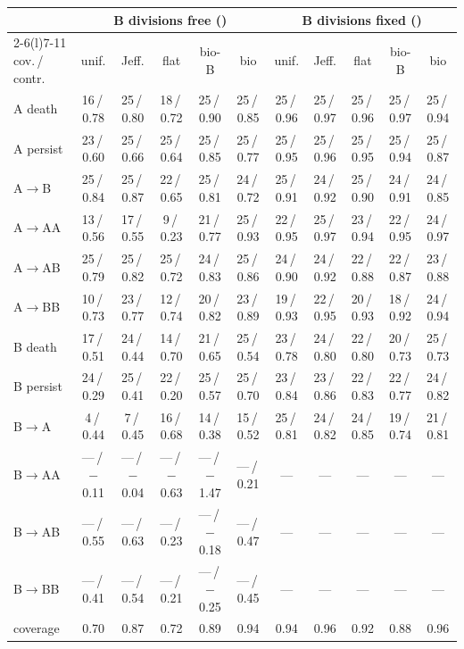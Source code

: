 \documentclass[10pt,a4paper]{article}
\newcommand{\code}[1]{\texttt{\detokenize{#1}}}
\begin{document}
\begin{center}
\medskip
\begin{tabular}{@{}lccccc@{\hspace{8pt}}ccccc@{}}\toprule
 & \multicolumn{5}{c}{B divisions free (\code{two_type})} & \multicolumn{5}{c}{B divisions fixed (\code{reversible_ab})} \\\cmidrule(lr){2-6}\cmidrule(l){7-11}
cov.\,/\,contr. & unif. & Jeff. & flat & bio-B & bio & unif. & Jeff. & flat & bio-B & bio \\\midrule
A death & 16\,/\,0.78 & 25\,/\,0.80 & 18\,/\,0.72 & 25\,/\,0.90 & 25\,/\,0.85 & 25\,/\,0.96 & 25\,/\,0.97 & 25\,/\,0.96 & 25\,/\,0.97 & 25\,/\,0.94 \\
A persist & 23\,/\,0.60 & 25\,/\,0.66 & 25\,/\,0.64 & 25\,/\,0.85 & 25\,/\,0.77 & 25\,/\,0.95 & 25\,/\,0.96 & 25\,/\,0.95 & 25\,/\,0.94 & 25\,/\,0.87 \\
A$\to$B & 25\,/\,0.84 & 25\,/\,0.87 & 22\,/\,0.65 & 25\,/\,0.81 & 24\,/\,0.72 & 25\,/\,0.91 & 24\,/\,0.92 & 25\,/\,0.90 & 24\,/\,0.91 & 24\,/\,0.85 \\
A$\to$AA & 13\,/\,0.56 & 17\,/\,0.55 & 9\,/\,0.23 & 21\,/\,0.77 & 25\,/\,0.93 & 22\,/\,0.95 & 25\,/\,0.97 & 23\,/\,0.94 & 22\,/\,0.95 & 24\,/\,0.97 \\
A$\to$AB & 25\,/\,0.79 & 25\,/\,0.82 & 25\,/\,0.72 & 24\,/\,0.83 & 25\,/\,0.86 & 24\,/\,0.90 & 24\,/\,0.92 & 22\,/\,0.88 & 22\,/\,0.87 & 23\,/\,0.88 \\
A$\to$BB & 10\,/\,0.73 & 23\,/\,0.77 & 12\,/\,0.74 & 20\,/\,0.82 & 23\,/\,0.89 & 19\,/\,0.93 & 22\,/\,0.95 & 20\,/\,0.93 & 18\,/\,0.92 & 24\,/\,0.94 \\
B death & 17\,/\,0.51 & 24\,/\,0.44 & 14\,/\,0.70 & 21\,/\,0.65 & 25\,/\,0.54 & 23\,/\,0.78 & 24\,/\,0.80 & 22\,/\,0.80 & 20\,/\,0.73 & 25\,/\,0.73 \\
B persist & 24\,/\,0.29 & 25\,/\,0.41 & 22\,/\,0.20 & 25\,/\,0.57 & 25\,/\,0.70 & 23\,/\,0.84 & 23\,/\,0.86 & 22\,/\,0.83 & 22\,/\,0.77 & 24\,/\,0.82 \\
B$\to$A & 4\,/\,0.44 & 7\,/\,0.45 & 16\,/\,0.68 & 14\,/\,0.38 & 15\,/\,0.52 & 25\,/\,0.81 & 24\,/\,0.82 & 24\,/\,0.85 & 19\,/\,0.74 & 21\,/\,0.81 \\
B$\to$AA & ---\,/\,$-$0.11 & ---\,/\,$-$0.04 & ---\,/\,$-$0.63 & ---\,/\,$-$1.47 & ---\,/\,0.21 & --- & --- & --- & --- & --- \\
B$\to$AB & ---\,/\,0.55 & ---\,/\,0.63 & ---\,/\,0.23 & ---\,/\,$-$0.18 & ---\,/\,0.47 & --- & --- & --- & --- & --- \\
B$\to$BB & ---\,/\,0.41 & ---\,/\,0.54 & ---\,/\,0.21 & ---\,/\,$-$0.25 & ---\,/\,0.45 & --- & --- & --- & --- & --- \\\midrule
coverage & 0.70 & 0.87 & 0.72 & 0.89 & 0.94 & 0.94 & 0.96 & 0.92 & 0.88 & 0.96 \\\bottomrule
\end{tabular}


\end{center}
\end{document}
